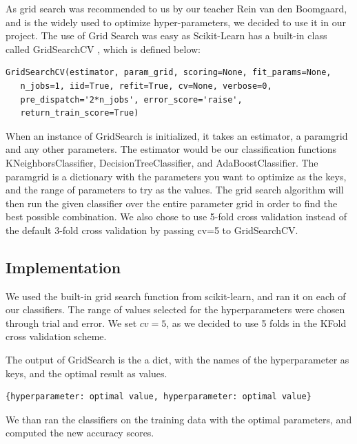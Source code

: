 \documentclass{article}
\begin{document}
		As grid search was recommended to us by our teacher Rein van den Boomgaard, and is the widely used to optimize hyper-parameters, we decided to use it in our project.
The use of Grid Search was easy as Scikit-Learn has a built-in class called GridSearchCV \cite{gridsearch}, which is defined below:
		
		
	\begin{lstlisting}
GridSearchCV(estimator, param_grid, scoring=None, fit_params=None, 
   n_jobs=1, iid=True, refit=True, cv=None, verbose=0, 
   pre_dispatch='2*n_jobs', error_score='raise',
   return_train_score=True)
	\end{lstlisting}
		
	When an instance of GridSearch is initialized, it takes an estimator, a param\textunderscore grid and any other parameters. The estimator would be our classification functions KNeighborsClassifier, DecisionTreeClassifier, and AdaBoostClassifier. The param\textunderscore grid is a dictionary with the parameters you want to optimize as the keys, and the range of parameters to try as the values. The grid search algorithm will then run the given classifier over the entire parameter grid in order to find the best possible combination. We also chose to use 5-fold cross validation instead of the default 3-fold cross validation by passing cv=5 to GridSearchCV.

	\subsection{Implementation}
		


		We used the built-in grid search function from scikit-learn, and ran it on each of our classifiers. The range of values selected for the hyperparameters were chosen through trial and error. We set $cv=5$, as we decided to use 5 folds in the KFold cross validation scheme. 


		
		The output of GridSearch is the a dict, with the names of the hyperparameter as keys, and the optimal result as values. 
		
		\begin{lstlisting}
{hyperparameter: optimal value, hyperparameter: optimal value}
		\end{lstlisting}

	We than ran the classifiers on the training data with the optimal parameters, and computed the new accuracy scores. 
\end{document}
